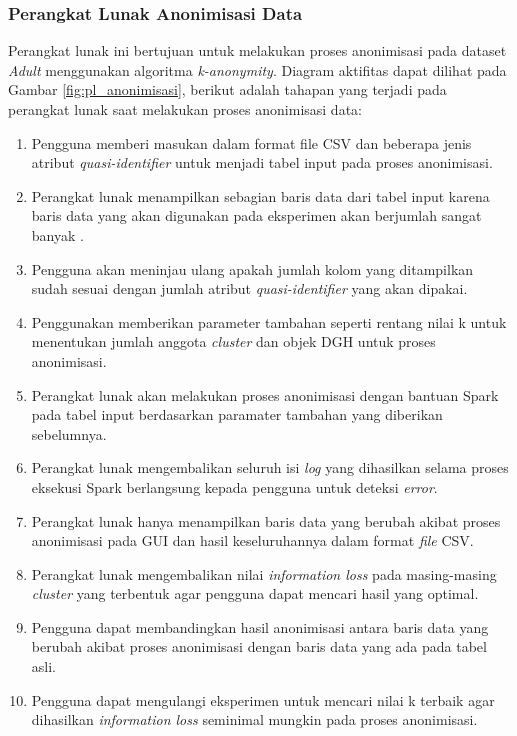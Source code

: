 \subsubsection{Perangkat Lunak Anonimisasi Data}
Perangkat lunak ini bertujuan untuk melakukan proses anonimisasi pada dataset \textit{Adult} menggunakan algoritma \textit{k-anonymity}. Diagram aktifitas dapat dilihat pada Gambar \ref{fig:pl_anonimisasi}, berikut adalah tahapan yang terjadi pada perangkat lunak saat melakukan proses anonimisasi data:

\begin{enumerate}

\item Pengguna memberi masukan dalam format file CSV dan beberapa jenis atribut \textit{quasi-identifier} untuk menjadi tabel input pada proses anonimisasi.

\item Perangkat lunak menampilkan sebagian baris data dari tabel input karena baris data yang akan digunakan pada eksperimen akan berjumlah sangat banyak .

\item Pengguna akan meninjau ulang apakah jumlah kolom yang ditampilkan sudah sesuai dengan jumlah atribut \textit{quasi-identifier} yang akan dipakai.

\item Penggunakan memberikan parameter tambahan seperti rentang nilai k untuk menentukan jumlah anggota \textit{cluster} dan objek DGH untuk proses anonimisasi.

\item Perangkat lunak akan melakukan proses anonimisasi dengan bantuan Spark pada tabel input berdasarkan paramater tambahan yang diberikan sebelumnya. 

\item Perangkat lunak mengembalikan seluruh isi \textit{log} yang dihasilkan selama proses eksekusi Spark berlangsung kepada pengguna untuk deteksi \textit{error}.

\item Perangkat lunak hanya menampilkan baris data yang berubah akibat proses anonimisasi pada GUI dan hasil keseluruhannya dalam format \textit{file} CSV.

\item Perangkat lunak mengembalikan nilai \textit{information loss} pada masing-masing \textit{cluster} yang terbentuk agar pengguna dapat mencari hasil yang optimal.

\item Pengguna dapat membandingkan hasil anonimisasi antara baris data yang berubah akibat proses anonimisasi dengan baris data yang ada pada tabel asli.

\item Pengguna dapat mengulangi eksperimen untuk mencari nilai k terbaik agar dihasilkan \textit{information loss} seminimal mungkin pada proses anonimisasi.


 
\end{enumerate}

